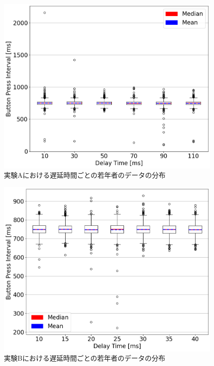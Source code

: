 \begin{figure}[tbp]
  \centering
  \includegraphics[scale=0.4]{figures/Honbann/BOXPLOT/BoxPlot_young_110ms.png}
  \caption{実験Aにおける遅延時間ごとの若年者のデータの分布}
  \label{fig:110ms_Distribution_of_observations}
\end{figure}
\begin{figure}[tbp]
  \centering
  \includegraphics[scale=0.4]{figures/Honbann/BOXPLOT/BoxPlot_young_40ms.png}
  \caption{実験Bにおける遅延時間ごとの若年者のデータの分布}
  \label{fig:40ms_Distribution_of_observations}
\end{figure}
